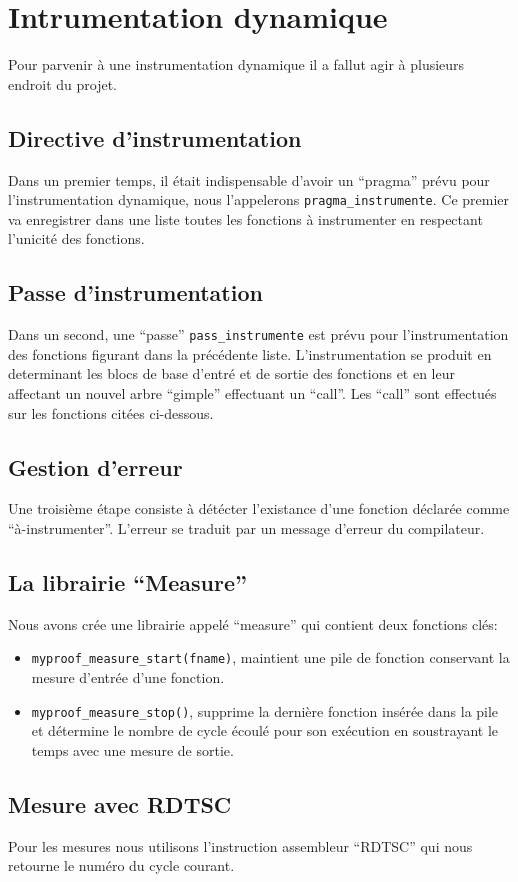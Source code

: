\section{Intrumentation dynamique}

Pour parvenir à une instrumentation dynamique il a fallut agir à plusieurs endroit du projet.

\subsection{Directive d'instrumentation}

Dans un premier temps, il était indispensable d'avoir un ``pragma'' prévu pour l'instrumentation dynamique, nous l'appelerons \verb#pragma_instrumente#. Ce premier va enregistrer dans une liste toutes les fonctions à instrumenter en respectant l'unicité des fonctions.

\subsection{Passe d'instrumentation}

Dans un second, une ``passe'' \verb#pass_instrumente# est prévu pour l'instrumentation des fonctions figurant dans la précédente liste. L'instrumentation se produit en determinant les blocs de base d'entré et de sortie des fonctions et en leur affectant un nouvel arbre ``gimple'' effectuant un ``call''. Les ``call'' sont effectués sur les fonctions citées ci-dessous.

\subsection{Gestion d'erreur}

Une troisième étape consiste à détécter l'existance d'une fonction déclarée comme ``à-instrumenter''. L'erreur se traduit par un message d'erreur du compilateur.

\subsection{La librairie ``Measure''}

Nous avons crée une librairie appelé ``measure'' qui contient deux fonctions clés:\\

\begin{itemize}

\item \verb#myproof_measure_start(fname)#, maintient une pile de fonction conservant la mesure d'entrée d'une fonction.\\

\item \verb#myproof_measure_stop()#, supprime la dernière fonction insérée dans la pile et détermine le nombre de cycle écoulé pour son exécution en soustrayant le temps avec une mesure de sortie.

\end{itemize}

\subsection{Mesure avec RDTSC}

Pour les mesures nous utilisons l'instruction assembleur ``RDTSC'' qui nous retourne le numéro du cycle courant.
